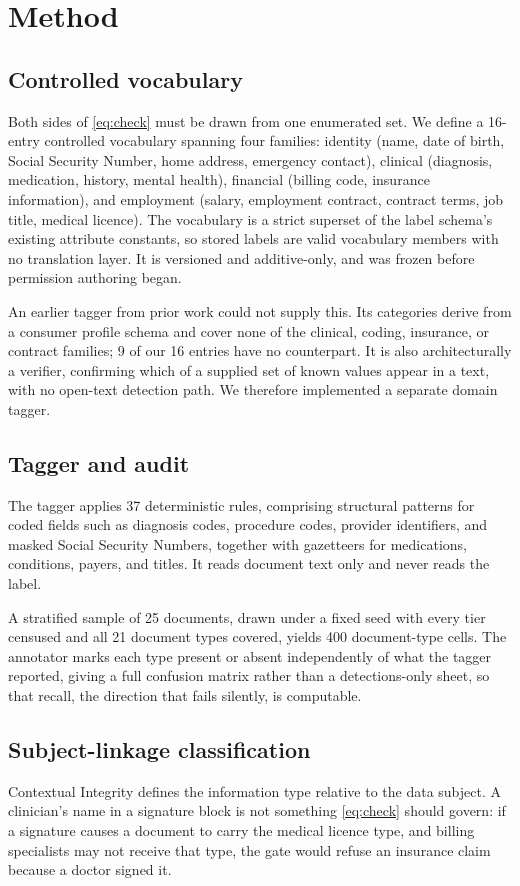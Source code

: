 \documentclass[conference]{IEEEtran}
\begin{document}
\section{Method}

\subsection{Controlled vocabulary}
Both sides of \eqref{eq:check} must be drawn from one enumerated set. We define
a 16-entry controlled vocabulary spanning four families: identity (name, date of
birth, Social Security Number, home address, emergency contact), clinical
(diagnosis, medication, history, mental health), financial (billing code,
insurance information), and employment (salary, employment contract, contract
terms, job title, medical licence). The vocabulary is a strict superset of the
label schema's existing attribute constants, so stored labels are valid
vocabulary members with no translation layer. It is versioned and
additive-only, and was frozen before permission authoring began.

An earlier tagger from prior work \cite{b28} could not supply this. Its
categories derive from a consumer profile schema and cover none of the clinical,
coding, insurance, or contract families; 9 of our 16 entries have no
counterpart. It is also architecturally a verifier, confirming which of a
supplied set of known values appear in a text, with no open-text detection path.
We therefore implemented a separate domain tagger.

\subsection{Tagger and audit}
\label{sec:tagger}
The tagger applies 37 deterministic rules, comprising structural patterns for
coded fields such as diagnosis codes, procedure codes, provider identifiers, and
masked Social Security Numbers, together with gazetteers for medications,
conditions, payers, and titles. It reads document text only and never reads the
label.

A stratified sample of 25 documents, drawn under a fixed seed with every tier
censused and all 21 document types covered, yields 400 document-type cells. The
annotator marks each type present or absent independently of what the tagger
reported, giving a full confusion matrix rather than a detections-only sheet, so
that recall, the direction that fails silently, is computable.

\subsection{Subject-linkage classification}
\label{sec:linkage}
Contextual Integrity defines the information type relative to the data subject.
A clinician's name in a signature block is not something \eqref{eq:check} should
govern: if a signature causes a document to carry the medical licence type, and
billing specialists may not receive that type, the gate would refuse an
insurance claim because a doctor signed it.
\end{document}
